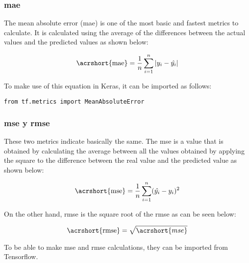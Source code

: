\subsubsection{\acrshort{mae}}

The mean absolute error (\acrshort{mae}) is one of the most basic and fastest metrics to calculate. It is calculated using the average of the differences between the actual values and the predicted values as shown below:

\begin{equation}
\centering
    \begin{split}
        \text{\acrshort{mae}} = \frac{1}{n} \sum_{i=1}^n |y_i - \hat{y_i}|
    \end{split}
\end{equation}

To make use of this equation in Keras, it can be imported as follows:


\begin{verbatim}
from tf.metrics import MeanAbsoluteError
\end{verbatim}

\subsubsection{\acrshort{mse} y \acrshort{rmse}}

These two metrics indicate basically the same. The \acrshort{mse} is a value that is obtained by calculating the average between all the values obtained by applying the square to the difference between the real value and the predicted value as shown below:

\begin{equation}
\centering
    \begin{split}
        \text{\acrshort{mse}} = \frac{1}{n} \sum_{i=1}^n (\hat{y_i} - y_i)^2
    \end{split}
\end{equation}

On the other hand, \acrshort{rmse} is the square root of the \acrshort{rmse} as can be seen below:

\begin{equation}
\centering
    \begin{split}
        \text{\acrshort{rmse}} = \sqrt{\acrshort{mse}}
    \end{split}
\end{equation}

To be able to make \acrshort{mse} and \acrshort{rmse} calculations, they can be imported from Tensorflow.

